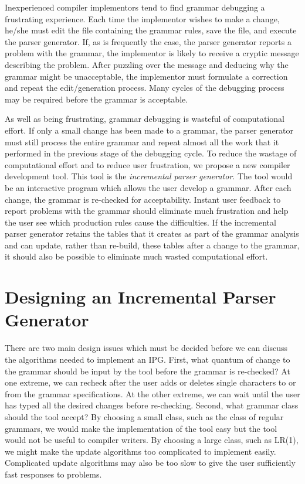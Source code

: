 Inexperienced compiler implementors tend to find grammar debugging
a frustrating experience.
Each time the implementor wishes to make a change, he/she must
edit the file containing the grammar rules,
save the file, and execute the parser generator.
If, as is frequently the case, the parser generator reports
a problem with the grammar, the implementor is likely to receive
a cryptic message describing the problem.
After puzzling over the message and deducing why the grammar might
be unacceptable, the implementor must formulate
a correction and repeat the edit/generation process.
Many cycles of the debugging process may be required before
the grammar is acceptable.

As well as being frustrating, grammar debugging is wasteful
of computational effort.
If only a small change has been made to a grammar,
the parser generator must still process the entire grammar
and repeat almost all the work that it performed in the
previous stage of the debugging cycle.
To reduce the wastage of computational effort and to reduce
user frustration, we propose a new compiler development tool.
This tool is the {\em incremental parser generator}.
The tool would be an interactive program which allows the
user develop a grammar.
After each change, the grammar is re-checked for acceptability.
Instant user feedback to report problems with the grammar should
eliminate much frustration and help the user see which production
rules cause the difficulties.
If the incremental parser generator retains the tables that it creates
as part of the grammar analysis and can update, rather than re-build,
these tables after a change to the grammar,
it should also be possible to eliminate much wasted computational effort.
\section{Designing an Incremental Parser Generator}

There are two main design issues which must be decided
before we can discuss the algorithms needed to implement an IPG.
First, what quantum of change to the grammar should be input by
the tool before the grammar is re-checked?
At one extreme, we can recheck after the user adds or deletes
single characters to or from the grammar specifications.
At the other extreme, we can wait until the user has typed all
the desired changes before re-checking.
Second, what grammar class should the tool accept?
By choosing a small class, such as the class of regular grammars,
we would make the implementation of the tool easy
but the tool would not be useful to compiler writers.
By choosing a large class, such as LR(1), we might make the
update algorithms too complicated to implement easily.
Complicated update algorithms may also be too slow to give
the user sufficiently fast responses to problems.

